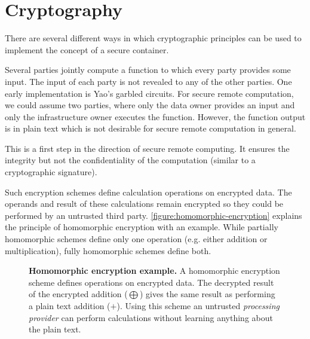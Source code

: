 \section{Cryptography\label{ID_265480959}\label{crypto}}
There are several different ways in which cryptographic principles can be used to implement the concept of a secure container.\label{ID_544485861}
\begin{description}\label{ID_958111314}
\item[Multi party computing]\label{ID_1564094585}
Several parties jointly compute a function to which every party provides some input. The input of each party is not revealed to any of the other parties. One early implementation is Yao's garbled circuits.\cite[]{Gupta}\label{ID_1507598191}
For secure remote computation, we could assume two parties, where only the data owner provides an input and only the infrastructure owner executes the function.\label{ID_1818312817}
However, the function output is in plain text which is not desirable for secure remote computation in general.\label{ID_647862117}
\item[Verifiable computing]\label{ID_1000386877}
This is a first step in the direction of secure remote computing. It ensures the integrity but not the confidentiality of the computation (similar to a cryptographic signature).\cite{Gennaro2010,Karapanos,Vu2013}\label{ID_1343830016}
\item[Homomorphic Encryption]\label{ID_1769833687}
Such encryption schemes define calculation operations on encrypted data. The operands and result of these calculations remain encrypted so they could be performed by an untrusted third party.\label{ID_1952238538}
\autoref{figure:homomorphic-encryption} explains the principle of homomorphic encryption with an example. While partially homomorphic schemes define only one operation (e.g. either addition or multiplication), fully homomorphic schemes define both.\label{ID_1116118751}
\begin{figure}[htbp]
\makebox[\textwidth][c]{
}\caption{\textbf{Homomorphic encryption example.}\label{ID_610399076}
A homomorphic encryption scheme defines operations on encrypted data. The decrypted result of the encrypted addition ($\bigoplus$) gives the same result as performing a plain text addition ($+$). Using this scheme an untrusted \textit{processing provider} can perform calculations without learning anything about the plain text.\label{ID_1072580727}
\label{ID_1989105116}\label{figure:homomorphic-encryption}}
\end{figure}


\end{description}
